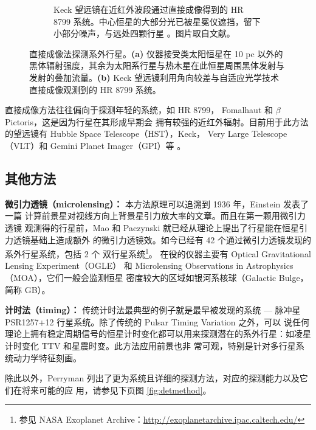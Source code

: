 \begin{figure}[h]
\begin{subfigure}[b]{.48\textwidth}
\caption[Keck 望远镜利用角向较差成像与自适应光学技术在近红外波段通过直接成像得到的 HR 8799 系统。中心恒星的大部分光已被星冕仪遮挡，留下小部分噪声，与远处四颗行星 。图片版权：Marois 等人。]{Keck 望远镜在近红外波段通过直接成像得到的 HR 8799 系统。中心恒星的大部分光已被星冕仪遮挡，留下小部分噪声，与远处四颗行星 。图片取自文献。}
\label{fig:hr8799}
\end{subfigure}
\caption{直接成像法探测系外行星。\textbf{(a)} 仪器接受类太阳恒星在 10 pc 以外的黑体辐射强度，其余为太阳系行星与热木星在此恒星周围黑体发射与发射的叠加流量。\textbf{(b)} Keck 望远镜利用角向较差与自适应光学技术直接成像观测到的 HR 8799 系统。}
\label{fig:directimage} 
\end{figure}

直接成像方法往往偏向于探测年轻的系统，如 HR 8799\cite{Marois2008HR8799}，
Fomalhaut\cite{Kalas2008} 和 $\beta$ Pictoris\cite{Lagrange2010}，这是因为行星在其形成早期会
拥有较强的近红外辐射。目前用于此方法的望远镜有 Hubble Space Telescope（HST），Keck，
Very Large Telescope（VLT）和 Gemini Planet Imager（GPI）等
\cite{Marois2008HR8799,Chauvin2005,Macintosh2014}。

\subsection{其他方法}
\textbf{微引力透镜（microlensing）：} 本方法原理可以追溯到 1936 年，Einstein 发表了一篇
计算前景星对视线方向上背景星引力放大率的文章\cite{Einstein1936}。而且在第一颗用微引力透镜
观测得的行星前，Mao 和  Paczynski 就已经从理论上提出了行星能在恒星引力透镜基础上造成额外
的微引力透镜效\cite{Mao1991}。如今已经有 42 个通过微引力透镜发现的系外行星系统，包括 2 个
双行星系统\footnote{参见 NASA Exoplanet Archive：\url{http://exoplanetarchive.ipac.caltech.edu/}}。
在役的仪器主要有 Optical Gravitational Lensing Experiment（OGLE）\cite{Udalskietal2002OGLE} 
和 Microlensing Observations in Astrophysics（MOA）\cite{Bond2004MOA}，它们一般会监测恒星
密度较大的区域如银河系核球（Galactic Bulge，简称 GB）。

\textbf{计时法（timing）：} 传统计时法最典型的例子就是最早被发现的系统 --- 脉冲星 
PSR1257+12 行星系统\cite{WolszczanFrail1992}。除了传统的 Pulsar Timing Variation 之外，可以
说任何理论上拥有稳定周期信号的恒星计时变化都可以用来探测潜在的系外行星：如凌星计时变化 
TTV\cite{Ford2011TTV,Xie2013} 和星震时变\cite{Silvotti2007,Murphy2016}。此方法应用前景也非
常可观，特别是针对多行星系统动力学特征刻画\cite{HolmanMurray2005}。

除此以外，Perryman 列出了更为系统且详细的探测方法，对应的探测能力以及它们在将来可能的应
用\cite{Perryman2000}，请参见下页图 \ref{fig:detmethod}。

